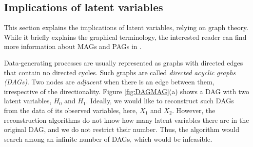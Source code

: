 \documentclass[conference]{IEEEtran}
\begin{document}
\subsection{Implications of latent variables}
\label{sec:implLatent}
This section explains the implications of latent variables, relying on graph theory.
While it briefly explains the graphical terminology, the interested reader can find more information about MAGs and PAGs in \cite[section 9.4.1]{peters_elements_2018}.

Data-generating processes are usually represented as graphs with directed edges that contain no directed cycles. Such graphs are called \textit{directed acyclic graphs (DAGs)}. Two nodes are \textit{adjacent} when there is an edge between them, irrespective of the directionality. Figure \ref{fig:DAGMAG}(a) shows a DAG with two latent variables, $H_0$ and $H_1$. Ideally, we would like to reconstruct such DAGs from the data of its observed variables, here, $X_1$ and $X_2$. However, the reconstruction algorithms do not know how many latent variables there are in the original DAG, and we do not restrict their number. Thus, the algorithm would search among an infinite number of DAGs, which would be infeasible.
\end{document}
